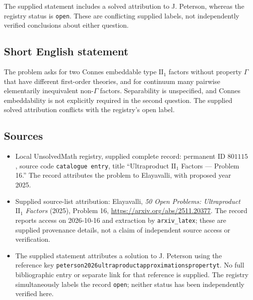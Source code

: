 \documentclass[11pt]{article}
\begin{document}
The supplied statement includes a solved attribution to J. Peterson, whereas the registry status is \texttt{open}. These are conflicting supplied labels, not independently verified conclusions about either question.
\subsection{Short English statement}
The problem asks for two Connes embeddable type \(\mathrm{II}_1\) factors without property \(\Gamma\) that have different first-order theories, and for continuum many pairwise elementarily inequivalent non-\(\Gamma\) factors. Separability is unspecified, and Connes embeddability is not explicitly required in the second question. The supplied solved attribution conflicts with the registry's open label.
\subsection{Sources}
\begin{itemize}
\item Local UnsolvedMath registry, supplied complete record: permanent ID \(801115\), source code \texttt{catalogue entry}, title ``Ultraproduct \(\mathrm{II}_1\) Factors --- Problem 16.'' The record attributes the problem to Elayavalli, with proposed year 2025.
\item Supplied source-list attribution: Elayavalli, \emph{50 Open Problems: Ultraproduct \(\mathrm{II}_1\) Factors} (2025), Problem 16, \url{https://arxiv.org/abs/2511.20377}. The record reports access on 2026-10-16 and extraction by \texttt{arxiv\_latex}; these are supplied provenance details, not a claim of independent source access or verification.
\item The supplied statement attributes a solution to J. Peterson using the reference key \texttt{peterson2026ultraproductapproximationspropertyt}. No full bibliographic entry or separate link for that reference is supplied. The registry simultaneously labels the record \texttt{open}; neither status has been independently verified here.
\end{itemize}
\end{document}
